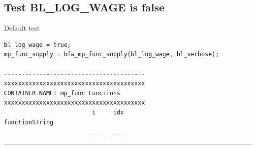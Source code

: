 \documentclass[
]{book}
\begin{document}
\hypertarget{test-bl_log_wage-is-false-1}{%
\subsection{Test BL\_LOG\_WAGE is false}\label{test-bl_log_wage-is-false-1}}

Default test

\begin{verbatim}
bl_log_wage = true;
mp_func_supply = bfw_mp_func_supply(bl_log_wage, bl_verbose);

----------------------------------------
xxxxxxxxxxxxxxxxxxxxxxxxxxxxxxxxxxxxxxxx
CONTAINER NAME: mp_func Functions
xxxxxxxxxxxxxxxxxxxxxxxxxxxxxxxxxxxxxxxx
                         i     idx                                                                                                                                   functionString                                                                                                                               
                        ___    ___    ____________________________________________________________________________________________________________________________________________________________________________________________________________________________________________________________________________


\end{verbatim}
\end{document}
